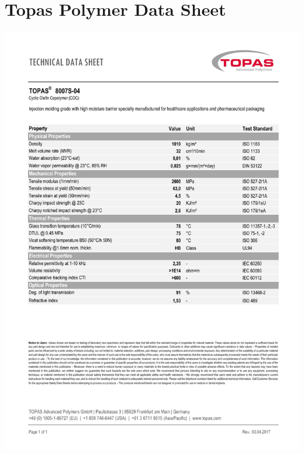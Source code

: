 \chapter{Topas Polymer Data Sheet}
\label{App:topaz}
\newpage
\centering
\includegraphics[page=1,scale=0.75]{Topas.pdf}
\appendix


